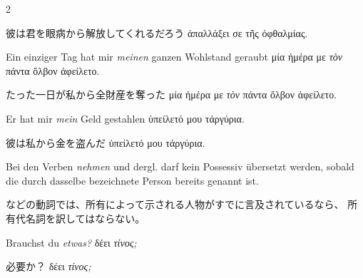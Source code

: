 \begin{paracol}{2}
\begin{enumerate}[leftmargin=0pt,rightmargin=0pt,listparindent =1cm,labelindent=1cm,labelsep=1ex,labelwidth={*},itemindent={*},align=left]
\begin{japanese}
彼は君を眼病から解放してくれるだろう
\textgreek[variant=ancient]{ἀπαλλάξει σε τῆς ὀφθαλμίας.}
\end{japanese}
\switchcolumn*

\begin{continuousitemline}
\begin{german}
Ein einziger Tag hat mir \emph{meinen}
ganzen Wohlstand geraubt \textgreek[variant=ancient]{μία ἡμέρα με
\emph{τὸν} πάντα ὄλβον ἀφείλετο.}
\end{german}
\switchcolumn

\begin{japanese}
たった一日が私から全財産を奪った
\textgreek[variant=ancient]{μία ἡμέρα με \emph{τὸν} πάντα ὄλβον ἀφείλετο.}
\end{japanese}
\switchcolumn*

\begin{german}
Er hat mir \emph{mein} Geld gestahlen \textgreek[variant=ancient]{ὑπείλετό
μου τἀργύρια.}
\end{german}
\switchcolumn

\begin{japanese}
彼は私から金を盗んだ \textgreek[variant=ancient]{ὑπείλετό
μου τἀργύρια.}
\end{japanese}
\switchcolumn*
\end{continuousitemline}

\begin{german}
Bei den Verben \emph{nehmen} und dergl. darf kein Possessiv übersetzt
werden, sobald die durch dasselbe bezeichnete Person bereits genannt
ist.
\end{german}
\switchcolumn

\begin{japanese}
などの動詞では、所有によって示される人物がすでに言及されているなら、
所有代名詞を訳してはならない。
\end{japanese}
\switchcolumn*

\begin{german}
\item Brauchst du \emph{etwas?} \textgreek[variant=ancient]{δέει \emph{τίνος;}}
\end{german}
\switchcolumn

\begin{japanese}
必要か？ \textgreek[variant=ancient]{δέει \emph{τίνος;}}
\end{japanese}
\switchcolumn*


\end{enumerate}
\end{paracol}

